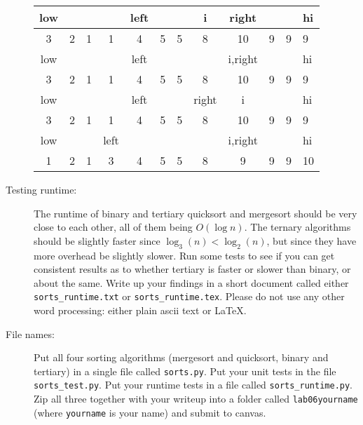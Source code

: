 \documentclass{article}
\begin{document}
\begin{description}
\begin{tabular}{|c|c|c|c|c|c|c|c|c|c|c|l|}
     low&        &        &        &    left&        &        &       i&   right&        &        &      hi\\\hline
       3&       2&       1&       1&       4&       5&       5&       8&      10&       9&       9&       9\\\hline\hline
     low&        &        &        &    left&        &        &        & i,right&        &        &      hi\\\hline
       3&       2&       1&       1&       4&       5&       5&       8&      10&       9&       9&       9\\\hline\hline
     low&        &        &        &    left&        &        &   right&       i&        &        &      hi\\\hline
       3&       2&       1&       1&       4&       5&       5&       8&      10&       9&       9&       9\\\hline\hline
     low&        &        &    left&        &        &        &        & i,right&        &        &      hi\\\hline
       1&       2&       1&       3&       4&       5&       5&       8&       9&       9&       9&      10\\\hline
\end{tabular}

\item[Testing runtime:]  The runtime of binary and tertiary quicksort and mergesort should
be very close to each other, all of them being $O(\log n)$.  The ternary algorithms
should be slightly faster since $\log_3(n) < \log_2(n)$, but since they have more
overhead be slightly slower.  Run some tests to see if you can get consistent results
as to whether tertiary is faster or slower than binary, or about the same.  Write up
your findings in a short document called either \lstinline{sorts_runtime.txt} or
\lstinline{sorts_runtime.tex}.  Please do not use any other word processing:
either plain ascii text or \LaTeX.

\item[File names:]  Put all four sorting algorithms (mergesort and quicksort, binary and
tertiary) in a single file called \verb|sorts.py|.  Put your unit tests in the file \verb|sorts_test.py|.
Put your runtime tests in a file called \verb|sorts_runtime.py|.  Zip all three together
with your writeup into a folder
called \verb|lab06yourname| (where \verb|yourname| is your name) and submit to canvas.

\end{description}
\end{document}
